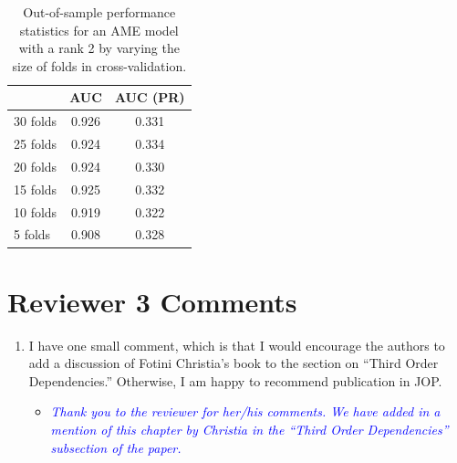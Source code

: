 \begin{enumerate}
\begin{itemize}
{{		}}
			\begin{table}[ht]
			\centering
			\begingroup\normalsize
			\begin{tabular}{lcc}
			  & AUC & AUC (PR) \\ 
			  \hline
			\hline
			30 folds & 0.926 & 0.331 \\ 
			25 folds & 0.924 & 0.334 \\ 
			  20 folds & 0.924 & 0.330 \\ 
			  15 folds & 0.925 & 0.332 \\ 
			  10 folds & 0.919 & 0.322 \\ 
			  5 folds & 0.908 & 0.328 \\ 
			   \hline
			\hline
			\end{tabular}
			\endgroup
			\caption{Out-of-sample performance statistics for an AME model with a rank 2 by varying the size of folds in cross-validation.} 
			\label{tab:ame_varFoldSize}
			\end{table}			
	\end{itemize}	
\end{enumerate}

\clearpage
\section*{Reviewer 3 Comments}

\begin{enumerate}
	\item I have one small comment, which is that I would encourage the authors to add a discussion of Fotini Christia's book to the section on ``Third Order Dependencies.'' Otherwise, I am happy to recommend publication in JOP.
	\begin{itemize}
		\item \textcolor{blue}{ \emph{
		Thank you to the reviewer for her/his comments. We have added in a mention of this chapter by Christia in the ``Third Order Dependencies'' subsection of the paper.
		}}	
	\end{itemize}
\end{enumerate}